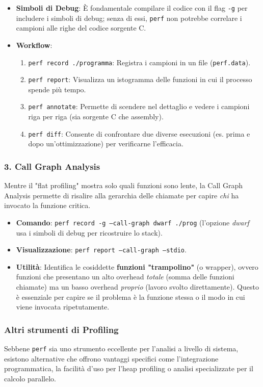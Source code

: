 \begin{itemize}
    \item \textbf{Simboli di Debug}: È fondamentale compilare il codice con il flag \texttt{-g} per includere i simboli di debug; senza di essi, \texttt{perf} non potrebbe correlare i campioni alle righe del codice sorgente C.
    \item \textbf{Workflow}:
    \begin{enumerate}
        \item \texttt{perf record ./programma}: Registra i campioni in un file (\texttt{perf.data}).
        \item \texttt{perf report}: Visualizza un istogramma delle funzioni in cui il processo spende più tempo.
        \item \texttt{perf annotate}: Permette di scendere nel dettaglio e vedere i campioni riga per riga (sia sorgente C che assembly).
        \item \texttt{perf diff}: Consente di confrontare due diverse esecuzioni (es. prima e dopo un'ottimizzazione) per verificarne l'efficacia.
    \end{enumerate}
\end{itemize}

\subsubsection*{3. Call Graph Analysis}
Mentre il "flat profiling" mostra solo quali funzioni sono lente, la Call Graph Analysis permette di risalire alla gerarchia delle chiamate per capire \textit{chi} ha invocato la funzione critica.

\begin{itemize}
    \item \textbf{Comando}: \texttt{perf record -g --call-graph dwarf ./prog} (l'opzione \textit{dwarf} usa i simboli di debug per ricostruire lo stack).
    \item \textbf{Visualizzazione}: \texttt{perf report --call-graph --stdio}.
    \item \textbf{Utilità}: Identifica le cosiddette \textbf{funzioni "trampolino"} (o wrapper), ovvero funzioni che presentano un alto overhead \textit{totale} (somma delle funzioni chiamate) ma un basso overhead \textit{proprio} (lavoro svolto direttamente). Questo è essenziale per capire se il problema è la funzione stessa o il modo in cui viene invocata ripetutamente.
\end{itemize}

\subsubsection{Altri strumenti di Profiling}
Sebbene \texttt{perf} sia uno strumento eccellente per l'analisi a livello di sistema, esistono alternative che offrono vantaggi specifici come l'integrazione programmatica, la facilità d'uso per l'heap profiling o analisi specializzate per il calcolo parallelo. 


